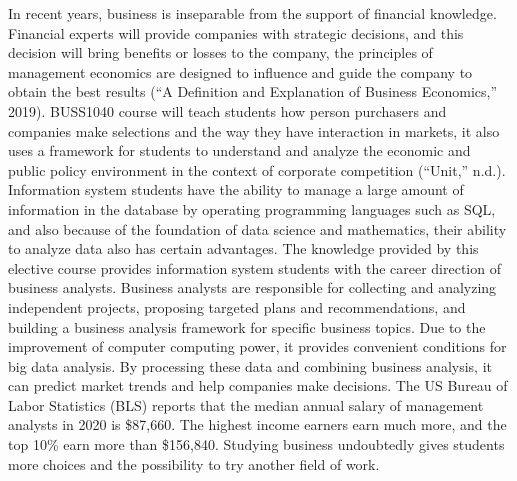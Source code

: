 \documentclass[12pt]{article}
\begin{document}
In recent years, business is inseparable from the support of financial knowledge. Financial experts will provide companies with strategic decisions, and this decision will bring benefits or losses to the company, the principles of management economics are designed to influence and guide the company to obtain the best results (“A Definition and Explanation of Business Economics,” 2019). BUSS1040 course will teach students how person purchasers and companies make selections and the way they have interaction in markets, it also uses a framework for students to understand and analyze the economic and public policy environment in the context of corporate competition (“Unit,” n.d.). Information system students have the ability to manage a large amount of information in the database by operating programming languages such as SQL, and also because of the foundation of data science and mathematics, their ability to analyze data also has certain advantages. The knowledge provided by this elective course provides information system students with the career direction of business analysts. Business analysts are responsible for collecting and analyzing independent projects, proposing targeted plans and recommendations, and building a business analysis framework for specific business topics. Due to the improvement of computer computing power, it provides convenient conditions for big data analysis. By processing these data and combining business analysis, it can predict market trends and help companies make decisions. The US Bureau of Labor Statistics (BLS) reports that the median annual salary of management analysts in 2020 is \$87,660. The highest income earners earn much more, and the top 10\% earn more than \$156,840. Studying business undoubtedly gives students more choices and the possibility to try another field of work.
\end{document}
